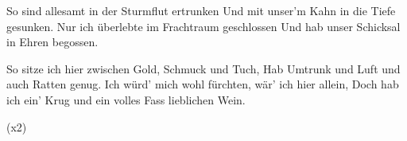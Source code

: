 \begin{guitar}
	So sind allesamt in der Sturmflut ertrunken
	Und mit unser'm Kahn in die Tiefe gesunken.
	Nur ich überlebte im Frachtraum geschlossen
	Und hab unser Schicksal in Ehren begossen.
	
	So sitze ich hier zwischen Gold, Schmuck und Tuch,
	Hab Umtrunk und Luft und auch Ratten genug.
	Ich würd' mich wohl fürchten, wär' ich hier allein,
	Doch hab ich ein' Krug und ein volles Fass lieblichen Wein.
	
	\begin{highlightbar}
		  (x2)
	\end{highlightbar}
\end{guitar}

